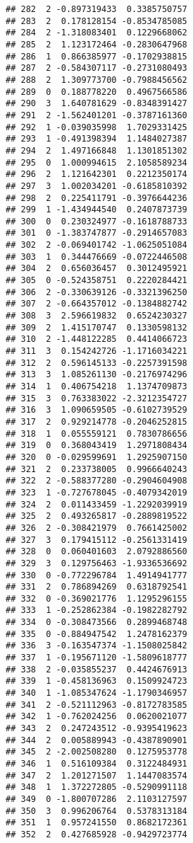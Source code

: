 \documentclass[
]{article}
\begin{document}
\begin{verbatim}
## 282  2 -0.897319433  0.3385750757
## 283  2  0.178128154 -0.8534785085
## 284  2 -1.318083401  0.1229668062
## 285  2  1.123172464 -0.2830647968
## 286  1  0.866385977 -0.1702938815
## 287  2 -0.584307117 -0.2731080493
## 288  2  1.309773700 -0.7988456562
## 289  0  0.188778220  0.4967566586
## 290  3  1.640781629 -0.8348391427
## 291  2 -1.562401201 -0.3787161360
## 292  1 -0.039035998  1.7029331425
## 293  1 -0.491398394  1.1484027387
## 294  2  1.497166848  1.1301851302
## 295  0  1.000994615  2.1058589234
## 296  2  1.121642301  0.2212350174
## 297  3  1.002034201 -0.6185810392
## 298  2  0.225411791 -0.3976644236
## 299  1 -1.434944540  0.2407873739
## 300  0  0.230324977 -0.1618788733
## 301  0 -1.383747877 -0.2914657083
## 302  2 -0.069401742 -1.0625051084
## 303  1  0.344476669 -0.0722446508
## 304  2  0.656036457  0.3012495921
## 305  0 -0.524358751  0.2220284421
## 306  2 -0.330639126 -0.3321396250
## 307  2 -0.664357012 -0.1384882742
## 308  3  2.596619832  0.6524230327
## 309  2  1.415170747  0.1330598132
## 310  2 -1.448122285  0.4414066723
## 311  3  0.154242726 -1.1716034221
## 312  2  0.596145133 -0.2257391598
## 313  3  1.085261130 -0.2176974296
## 314  1  0.406754218  1.1374709873
## 315  3  0.763383022 -2.3212354727
## 316  3  1.090659505 -0.6102739529
## 317  2  0.929214778 -0.2046252815
## 318  1  0.055559121  0.7830786656
## 319  0  0.368043419  1.2971808434
## 320  0 -0.029599691  1.2925907150
## 321  2  0.233738005  0.9966640243
## 322  2 -0.588377280 -0.2904604908
## 323  1 -0.727678045 -0.4079342019
## 324  2  0.011433459 -1.2292039919
## 325  2  0.493265817 -0.2889819522
## 326  2 -0.308421979  0.7661425002
## 327  3  0.179415112 -0.2561331419
## 328  0  0.060401603  2.0792886560
## 329  3  0.129756463 -1.9336536692
## 330  0 -0.772296784  1.4914941777
## 331  2  0.786894269  0.6318792541
## 332  0 -0.369021776  1.1295296155
## 333  1 -0.252862384 -0.1982282792
## 334  0 -0.308473566  0.2899468748
## 335  0 -0.884947542  1.2478162379
## 336  3 -0.163547374 -1.1508025842
## 337  1 -0.195671120 -1.5809618777
## 338  2 -0.035855237  0.4424676913
## 339  1 -0.458136963  0.1509924723
## 340  1 -1.085347624 -1.1790346957
## 341  2 -0.521112963 -0.8172783585
## 342  1 -0.762024256  0.0620021077
## 343  2  0.247243512 -0.9395419623
## 344  2  0.005889943 -0.4387890901
## 345  2 -2.002508280  0.1275953778
## 346  1  0.516109384  0.3122484931
## 347  2  1.201271507  1.1447083574
## 348  1  1.372272805 -0.5290991118
## 349  0 -1.800707286  2.1103127597
## 350  3  0.996206764  0.5378313184
## 351  1  0.957241550  0.8682172361
## 352  2  0.427685928 -0.9429723774

\end{verbatim}
\end{document}
